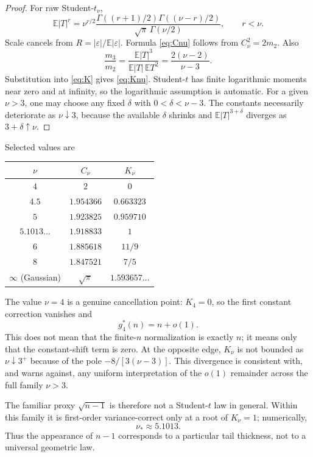 \documentclass[11pt,a4paper]{article}
\newcommand{\E}{\mathbb E}
\begin{document}
\begin{proof}
For raw Student-$t_\nu$,
\[
\E|T|^r
=\nu^{r/2}\frac{\Gamma((r+1)/2)\Gamma((\nu-r)/2)}{\sqrt\pi\,\Gamma(\nu/2)},
\qquad r<\nu.
\]
Scale cancels from $R=|\varepsilon|/\E|\varepsilon|$.  Formula \eqref{eq:Cnu} follows from $C_\nu^2=2m_2$.  Also
\[
\frac{m_3}{m_2}
=\frac{\E|T|^3}{\E|T|\,\E T^2}
=\frac{2(\nu-2)}{\nu-3}.
\]
Substitution into \eqref{eq:K} gives \eqref{eq:Knu}.  Student-$t$ has finite logarithmic moments near zero and at infinity, so the logarithmic assumption is automatic.  For a given $\nu>3$, one may choose any fixed $\delta$ with $0<\delta<\nu-3$.  The constants necessarily deteriorate as $\nu\downarrow3$, because the available $\delta$ shrinks and $\E|T|^{3+\delta}$ diverges as $3+\delta\uparrow\nu$.
\end{proof}

Selected values are
\begin{center}
\begin{tabular}{ccc}
\toprule
$\nu$ & $C_\nu$ & $K_\nu$\\
\midrule
$4$ & $2$ & $0$\\
$4.5$ & $1.954366$ & $0.663323$\\
$5$ & $1.923825$ & $0.959710$\\
$5.1013\ldots$ & $1.918833$ & $1$\\
$6$ & $1.885618$ & $11/9$\\
$8$ & $1.847521$ & $7/5$\\
$\infty$ (Gaussian) & $\sqrt\pi$ & $1.593657\ldots$\\
\bottomrule
\end{tabular}
\end{center}
The value $\nu=4$ is a genuine cancellation point: $K_4=0$, so the first constant correction vanishes and
\[
g_4^*(n)=n+o(1).
\]
This does not mean that the finite-$n$ normalization is exactly $n$; it means only that the constant-shift term is zero.  At the opposite edge, $K_\nu$ is not bounded as $\nu\downarrow3^+$ because of the pole $-8/[3(\nu-3)]$.  This divergence is consistent with, and warns against, any uniform interpretation of the $o(1)$ remainder across the full family $\nu>3$.

The familiar proxy $\sqrt{n-1}$ is therefore not a Student-$t$ law in general.  Within this family it is first-order variance-correct only at a root of $K_\nu=1$; numerically,
\[
\nu_*\approx5.1013.
\]
Thus the appearance of $n-1$ corresponds to a particular tail thickness, not to a universal geometric law.
\end{document}
